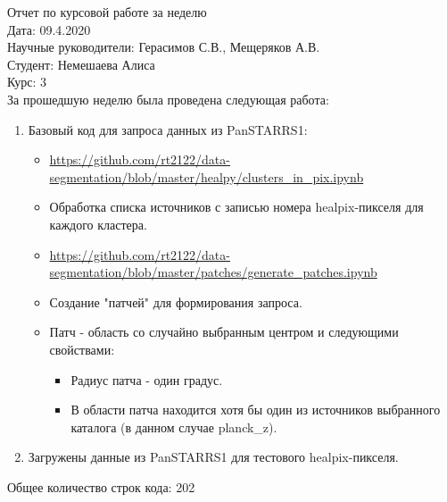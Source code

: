 \documentclass{article}
\begin{document}
Отчет по курсовой работе за неделю\\
Дата: 09.4.2020\\
Научные руководители: Герасимов С.В., Мещеряков А.В.\\
Студент: Немешаева Алиса\\
Курс: 3\\

\renewcommand{\labelitemi}{$\blacksquare$}
\renewcommand\labelitemii{$\square$}
За прошедшую неделю была проведена следующая работа:\\
\begin{enumerate}
    \item Базовый код для запроса данных из PanSTARRS1: \\
        \begin{itemize}
            \item \url{https://github.com/rt2122/data-segmentation/blob/master/healpy/clusters_in_pix.ipynb}\\
            \item Обработка списка источников с записью номера healpix-пикселя для каждого кластера. \\
            \item \url{https://github.com/rt2122/data-segmentation/blob/master/patches/generate_patches.ipynb} \\
            \item Создание "патчей" для формирования запроса. \\
            \item Патч - область со случайно выбранным центром и следующими свойствами: \\
                \begin{itemize}
                    \item Радиус патча - один градус.\\
                    \item В области патча находится хотя бы один из источников выбранного каталога (в данном случае planck\_z).\\
                \end{itemize}
        \end{itemize}
    \item Загружены данные из PanSTARRS1 для тестового healpix-пикселя.\\

\end{enumerate}

Общее количество строк кода: 202 \\
\end{document}
